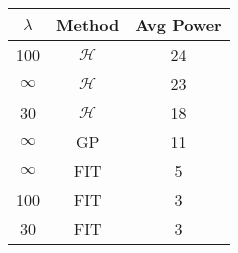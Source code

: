 \centering \begin{tabular}{c|c|c}
$\lambda$	&Method	&Avg Power\\\hline
100	&$\mathcal{H}$	&24\\
$\infty$	&$\mathcal{H}$	&23\\
30	&$\mathcal{H}$	&18\\
$\infty$	&GP	&11\\
$\infty$	&FIT	&5\\
100	&FIT	&3\\
30	&FIT	&3\\
\end{tabular}

